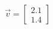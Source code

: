 \documentclass[preview]{standalone}
\begin{document}
\begin{align*}
\vec{v}=\begin{bmatrix}2.1\\1.4\end{bmatrix}
\end{align*}
\end{document}
